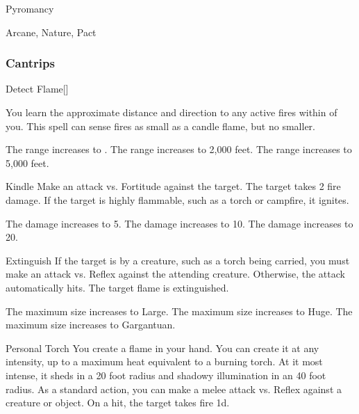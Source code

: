 \newpage
\begin{spellsection}{Pyromancy}

\begin{spellheader}
\end{spellheader}


 Arcane, Nature, Pact

\subsubsection{Cantrips}


\begin{freeability}{Detect Flame}[]

You learn the approximate distance and direction to any active fires within \rnglong {} of you.
This spell can sense fires as small as a candle flame, but no smaller.

\rankline
{} The range increases to \rngext.
 The range increases to 2,000 feet.
 The range increases to 5,000 feet.
\end{freeability}


\begin{freeability}{Kindle}
Make an attack vs. Fortitude against the target.
\hit The target takes 2 fire damage.
If the target is highly flammable, such as a torch or campfire, it ignites.

\rankline
{} The damage increases to 5.
 The damage increases to 10.
 The damage increases to 20.
\end{freeability}


\begin{freeability}{Extinguish}
If the target is  by a creature, such as a torch being carried, you must make an attack vs. Reflex against the attending creature.
Otherwise, the attack automatically hits.
\hit The target flame is extinguished.

\rankline
{} The maximum size increases to Large.
 The maximum size increases to Huge.
 The maximum size increases to Gargantuan.
\end{freeability}


\begin{freeability}{Personal Torch}
You create a flame in your hand.
You can create it at any intensity, up to a maximum heat equivalent to a burning torch.
At it most intense, it sheds  in a 20 foot radius and shadowy illumination in an 40 foot radius.
As a standard action, you can make a melee attack vs. Reflex against a creature or object.
On a hit, the target takes fire  \minus1d.


\end{freeability}
\end{spellsection}
